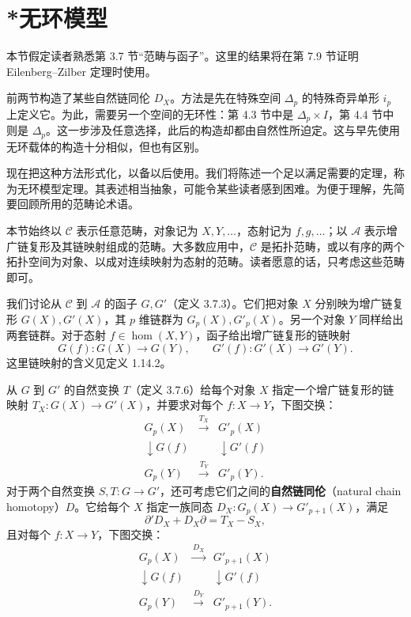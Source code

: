 \section{\texorpdfstring{*无环模型}{*无环模型}}
本节假定读者熟悉第 3.7 节“范畴与函子”。这里的结果将在第 7.9 节证明 Eilenberg--Zilber 定理时使用。

前两节构造了某些自然链同伦 $D_X$。方法是先在特殊空间 $\Delta_p$ 的特殊奇异单形 $i_p$ 上定义它。为此，需要另一个空间的无环性：第 4.3 节中是 $\Delta_p\times I$，第 4.4 节中则是 $\Delta_p$。这一步涉及任意选择，此后的构造却都由自然性所迫定。这与早先使用无环载体的构造十分相似，但也有区别。

现在把这种方法形式化，以备以后使用。我们将陈述一个足以满足需要的定理，称为无环模型定理。其表述相当抽象，可能令某些读者感到困难。为便于理解，先简要回顾所用的范畴论术语。

本节始终以 $\mathcal C$ 表示任意范畴，对象记为 $X,Y,\ldots$，态射记为 $f,g,\ldots$；以 $\mathcal A$ 表示增广链复形及其链映射组成的范畴。大多数应用中，$\mathcal C$ 是拓扑范畴，或以有序的两个拓扑空间为对象、以成对连续映射为态射的范畴。读者愿意的话，只考虑这些范畴即可。

我们讨论从 $\mathcal C$ 到 $\mathcal A$ 的函子 $G,G'$（定义 3.7.3）。它们把对象 $X$ 分别映为增广链复形 $G(X),G'(X)$，其 $p$ 维链群为 $G_p(X),G'_p(X)$。另一个对象 $Y$ 同样给出两套链群。对于态射 $f\in\operatorname{hom}(X,Y)$，函子给出增广链复形的链映射
\[
G(f):G(X)\to G(Y),\qquad G'(f):G'(X)\to G'(Y).
\]
这里链映射的含义见定义 1.14.2。

从 $G$ 到 $G'$ 的自然变换 $T$（定义 3.7.6）给每个对象 $X$ 指定一个增广链复形的链映射 $T_X:G(X)\to G'(X)$，并要求对每个 $f:X\to Y$，下图交换：
\[
\begin{array}{ccc}
G_p(X)&\xrightarrow{T_X}&G'_p(X)\\
\downarrow\scriptstyle G(f)&&\downarrow\scriptstyle G'(f)\\
G_p(Y)&\xrightarrow{T_Y}&G'_p(Y).
\end{array}
\]
对于两个自然变换 $S,T:G\to G'$，还可考虑它们之间的\textbf{自然链同伦}（natural chain homotopy）$D$。它给每个 $X$ 指定一族同态 $D_X:G_p(X)\to G'_{p+1}(X)$，满足
\[
\partial'D_X+D_X\partial=T_X-S_X,
\]
且对每个 $f:X\to Y$，下图交换：
\[
\begin{array}{ccc}
G_p(X)&\xrightarrow{D_X}&G'_{p+1}(X)\\
\downarrow\scriptstyle G(f)&&\downarrow\scriptstyle G'(f)\\
G_p(Y)&\xrightarrow{D_Y}&G'_{p+1}(Y).
\end{array}
\]

